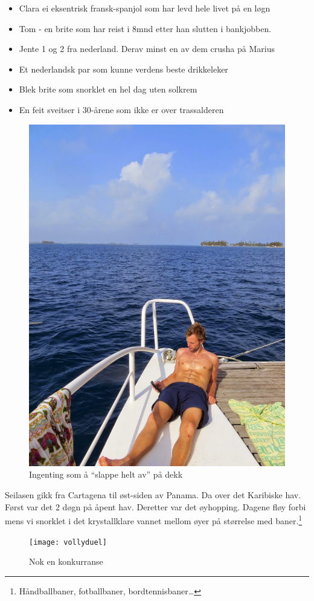 \begin{itemize}
	\item Clara ei eksentrisk fransk-spanjol som har levd hele
		livet på en løgn
	\item Tom - en brite som har reist i 8mnd etter han slutten i
		bankjobben.
	\item Jente 1 og 2 fra nederland. Derav minst en av dem crusha på Marius
	\item Et nederlandsk par som kunne verdens beste drikkeleker
	\item Blek brite som snorklet en hel dag uten solkrem
	\item En feit sveitser i 30-årene som ikke er over
		trassalderen
\end{itemize}
\begin{figure}[H]
	\centering
	\includegraphics[width=\textwidth]{flex}
	\caption{Ingenting som å ``slappe helt av'' på dekk}
	\label{fig:tintin}
\end{figure}
Seilasen gikk fra Cartagena til øst-siden av Panama. Da over det
Karibiske hav. Først var det 2 døgn på åpent hav. Deretter var det
øyhopping. Dagene fløy forbi mens vi snorklet i det krystallklare vannet
mellom øyer på størrelse med baner.\footnote{Håndballbaner,
fotballbaner, bordtennisbaner\ldots }
\begin{figure}[H]
	\centering
	\texttt{[image: vollyduel]}
	\caption{Nok en konkurranse}
	\label{fig:volley}
\end{figure}



